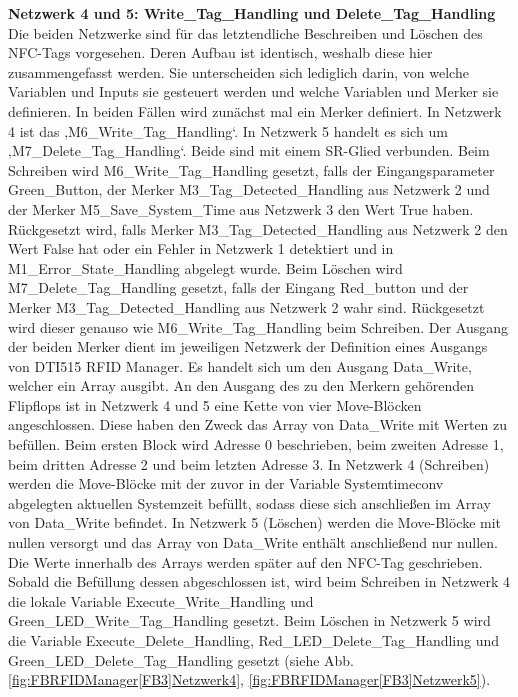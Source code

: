 \textbf{Netzwerk 4 und 5: Write\_Tag\_Handling und Delete\_Tag\_Handling}\\
Die beiden Netzwerke sind für das letztendliche Beschreiben und Löschen des NFC-Tags vorgesehen. Deren Aufbau ist identisch, weshalb diese hier zusammengefasst werden. Sie unterscheiden sich lediglich darin, von welche Variablen und Inputs sie gesteuert werden und welche Variablen und Merker sie definieren. In beiden Fällen wird zunächst mal ein Merker definiert. In Netzwerk 4 ist das ‚M6\_Write\_Tag\_Handling‘. In Netzwerk 5 handelt es sich um ‚M7\_Delete\_Tag\_Handling‘. Beide sind mit einem SR-Glied verbunden. Beim Schreiben wird M6\_Write\_Tag\_Handling gesetzt, falls der Eingangsparameter Green\_Button, der Merker M3\_Tag\_Detected\_Handling aus Netzwerk 2 und der Merker M5\_Save\_System\_Time aus Netzwerk 3 den Wert True haben. Rückgesetzt wird, falls Merker M3\_Tag\_Detected\_Handling aus Netzwerk 2 den Wert False hat oder ein Fehler in Netzwerk 1 detektiert und in M1\_Error\_State\_Handling abgelegt wurde. Beim Löschen wird M7\_Delete\_Tag\_Handling gesetzt, falls der Eingang Red\_button und der Merker M3\_Tag\_Detected\_Handling aus Netzwerk 2 wahr sind. Rückgesetzt wird dieser genauso wie M6\_Write\_Tag\_Handling beim Schreiben. Der Ausgang der beiden Merker dient im jeweiligen Netzwerk der Definition eines Ausgangs von DTI515 RFID Manager. Es handelt sich um den Ausgang Data\_Write, welcher ein Array ausgibt. An den Ausgang des zu den Merkern gehörenden Flipflops ist in Netzwerk 4 und 5 eine Kette von vier Move-Blöcken angeschlossen. Diese haben den Zweck das Array von Data\_Write mit Werten zu befüllen. Beim ersten Block wird Adresse 0 beschrieben, beim zweiten Adresse 1, beim dritten Adresse 2 und beim letzten Adresse 3. In Netzwerk 4 (Schreiben) werden die Move-Blöcke mit der zuvor in der Variable Systemtimeconv abgelegten aktuellen Systemzeit befüllt, sodass diese sich anschließen im Array von Data\_Write befindet. In Netzwerk 5 (Löschen) werden die Move-Blöcke mit nullen versorgt und das Array von Data\_Write enthält anschließend nur nullen. Die Werte innerhalb des Arrays werden später auf den NFC-Tag geschrieben. Sobald die Befüllung dessen abgeschlossen ist, wird beim Schreiben in Netzwerk 4 die lokale Variable Execute\_Write\_Handling und Green\_LED\_Write\_Tag\_Handling gesetzt. Beim Löschen in Netzwerk 5 wird die Variable Execute\_Delete\_Handling, Red\_LED\_Delete\_Tag\_Handling und Green\_LED\_Delete\_Tag\_Handling gesetzt  (siehe Abb. \ref{fig:FBRFIDManager[FB3]Netzwerk4}, \ref{fig:FBRFIDManager[FB3]Netzwerk5}).

